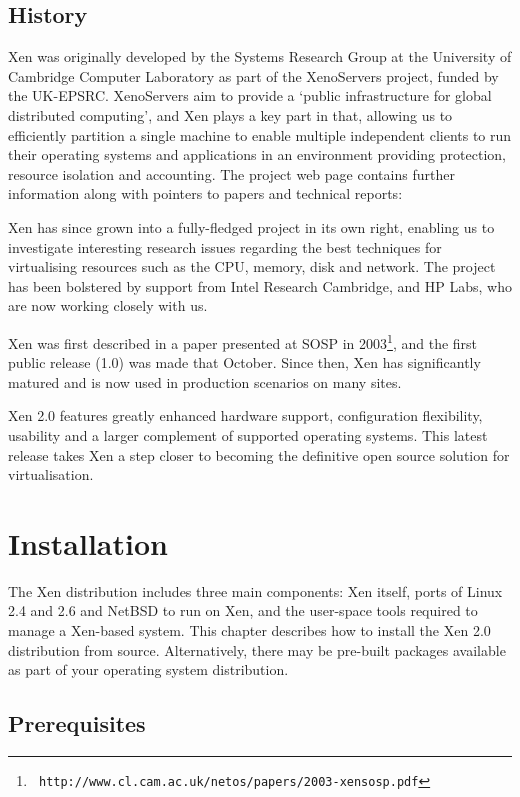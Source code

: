 \documentclass[11pt,twoside,final,openright]{report}
\begin{document}
\section{History}

Xen was originally developed by the Systems Research Group at the
University of Cambridge Computer Laboratory as part of the XenoServers
project, funded by the UK-EPSRC.
XenoServers aim to provide a `public infrastructure for
global distributed computing', and Xen plays a key part in that,
allowing us to efficiently partition a single machine to enable
multiple independent clients to run their operating systems and
applications in an environment providing protection, resource
isolation and accounting.  The project web page contains further
information along with pointers to papers and technical reports:

Xen has since grown into a fully-fledged project in its own right,
enabling us to investigate interesting research issues regarding the
best techniques for virtualising resources such as the CPU, memory,
disk and network.  The project has been bolstered by support from
Intel Research Cambridge, and HP Labs, who are now working closely
with us.

Xen was first described in a paper presented at SOSP in
2003\footnote{\tt
http://www.cl.cam.ac.uk/netos/papers/2003-xensosp.pdf}, and the first
public release (1.0) was made that October.  Since then, Xen has
significantly matured and is now used in production scenarios on
many sites.

Xen 2.0 features greatly enhanced hardware support, configuration
flexibility, usability and a larger complement of supported operating
systems. This latest release takes Xen a step closer to becoming the 
definitive open source solution for virtualisation.

\chapter{Installation}

The Xen distribution includes three main components: Xen itself, ports
of Linux 2.4 and 2.6 and NetBSD to run on Xen, and the user-space
tools required to manage a Xen-based system.  This chapter describes
how to install the Xen 2.0 distribution from source.  Alternatively,
there may be pre-built packages available as part of your operating
system distribution.

\section{Prerequisites}
\label{sec:prerequisites}
\end{document}
